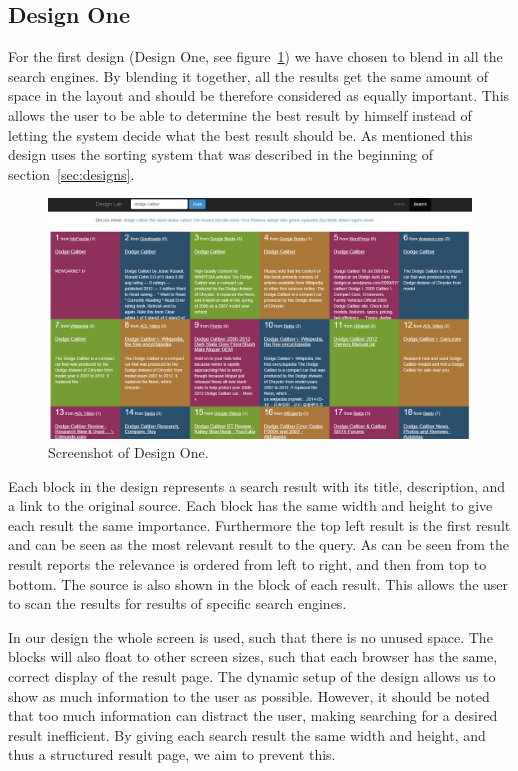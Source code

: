 \documentclass[12pt]{article}
\begin{document}
\subsection{Design One}
\label{sec:layoutHan}
For the first design (Design One, see figure~\ref{fig:designOne}) we have chosen to blend in all the search engines.
By blending it together, all the results get the same amount of space in the layout and should be therefore considered as equally important. 
This allows the user to be able to determine the best result by himself instead of letting the system decide what the best result should be.
As mentioned this design uses the sorting system that was described in the beginning of section~\ref{sec:designs}.

\begin{figure}[h!]
  \centering
    \includegraphics[width=1.0\textwidth]{designOne.png}
  \caption{Screenshot of Design One.}
\label{fig:designOne}
\end{figure}

Each block in the design represents a search result with its title, description, and a link to the original source. 
Each block has the same width and height to give each result the same importance. 
Furthermore the top left result is the first result and can be seen as the most relevant result to the query.
As can be seen from the result reports the relevance is ordered from left to right, and then from top to bottom. 
The source is also shown in the block of each result.
This allows the user to scan the results for results of specific search engines. 

In our design the whole screen is used, such that there is no unused space. 
The blocks will also float to other screen sizes, such that each browser has the same, correct display of the result page.
The dynamic setup of the design allows us to show as much information to the user as possible. 
However, it should be noted that too much information can distract the user, making searching for a desired result inefficient.
By giving each search result the same width and height, and thus a structured result page, we aim to prevent this. 
\end{document}

